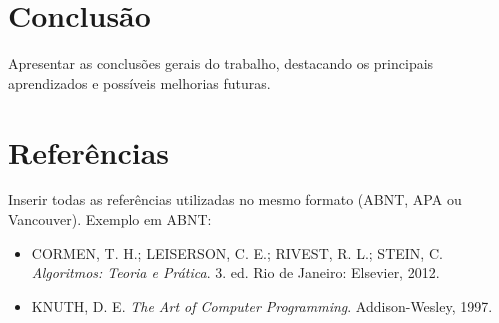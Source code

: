 \documentclass[12pt,a4paper]{article}
\begin{document}
\section{Conclusão}
Apresentar as conclusões gerais do trabalho, destacando os principais aprendizados e possíveis melhorias futuras.

\section{Referências}
Inserir todas as referências utilizadas no mesmo formato (ABNT, APA ou Vancouver).  
Exemplo em ABNT:
\begin{itemize}
    \item CORMEN, T. H.; LEISERSON, C. E.; RIVEST, R. L.; STEIN, C. \textit{Algoritmos: Teoria e Prática}. 3. ed. Rio de Janeiro: Elsevier, 2012.
    \item KNUTH, D. E. \textit{The Art of Computer Programming}. Addison-Wesley, 1997.
\end{itemize}
\end{document}
